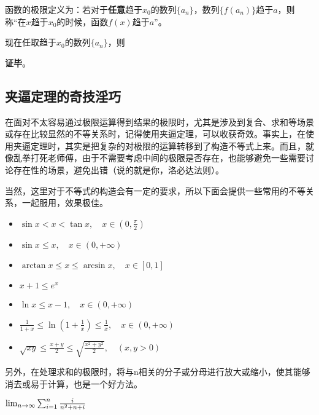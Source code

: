 函数的极限定义为：若对于\textbf{任意}趋于$x_0$的数列$\{a_n\}$，数列$\{f(a_n)\}$趋于$a$，则称“在$x$趋于$x_0$的时候，函数$f(x)$趋于$a$”。

现在任取趋于$x_0$的数列$\{a_n\}$，则

\textbf{证毕}。







\subsection{夹逼定理的奇技淫巧}

在面对不太容易通过极限运算得到结果的极限时，尤其是涉及到复合、求和等场景或存在比较显然的不等关系时，记得使用夹逼定理，可以收获奇效。事实上，在使用夹逼定理时，其实是把复杂的对极限的运算转移到了构造不等式上来。而且，就像乱拳打死老师傅，由于不需要考虑中间的极限是否存在，也能够避免一些需要讨论存在性的场景，避免出错（说的就是你，洛必达法则）。

当然，这里对于不等式的构造会有一定的要求，所以下面会提供一些常用的不等关系，一起服用，效果极佳。

\begin{itemize}
\item $\sin x < x < \tan x, \quad x \in \left(0, \frac{\pi}{2}\right)$
\item $\sin x \leq x, \quad x \in (0, +\infty)$
\item $\arctan x \leq x \leq \arcsin x, \quad x \in [0, 1] $
\item $x + 1\leq e^x$
\item $\ln x\leq x - 1 , \quad x \in (0, +\infty)$
\item $\frac{1}{1 + x} \leq \ln\left(1 + \frac{1}{x}\right) \leq \frac{1}{x}, \quad x \in (0, +\infty)$
\item $\sqrt{xy} \leq \frac{x + y}{2} \leq \sqrt{\frac{x^2 + y^2}{2}}, \quad (x, y > 0)$
\end{itemize}

\begin{example}{}

\end{example}
另外，在处理求和的极限时，将与n相关的分子或分母进行放大或缩小，使其能够消去或易于计算，也是一个好方法。
\begin{example}{$\lim_{n\to \infty}\sum_{i=1}^n{i\over n^2+n+i}$}
\end{example}



